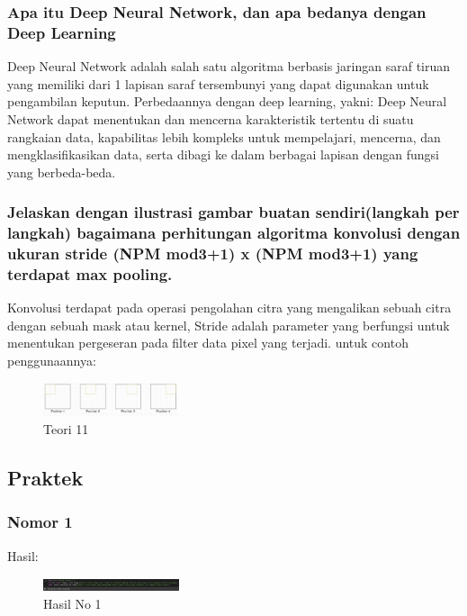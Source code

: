 \subsubsection{Apa itu Deep Neural Network, dan apa bedanya dengan Deep Learning}
\hfill\break
Deep Neural Network adalah salah satu algoritma berbasis jaringan saraf tiruan yang memiliki dari 1 lapisan saraf tersembunyi yang dapat digunakan untuk pengambilan keputun. Perbedaannya dengan deep learning, yakni: Deep Neural Network dapat menentukan dan mencerna karakteristik tertentu di suatu rangkaian data, kapabilitas lebih kompleks untuk mempelajari, mencerna, dan mengklasifikasikan data, serta dibagi ke dalam berbagai lapisan dengan fungsi yang berbeda-beda.

\subsubsection{Jelaskan dengan ilustrasi gambar buatan sendiri(langkah per langkah) bagaimana perhitungan algoritma konvolusi dengan ukuran stride (NPM mod3+1) x (NPM mod3+1) yang terdapat max pooling.}	
\hfill\break
Konvolusi terdapat pada operasi pengolahan citra yang mengalikan sebuah citra dengan sebuah mask atau kernel, Stride adalah parameter yang berfungsi untuk menentukan pergeseran pada filter data pixel yang terjadi. untuk contoh penggunaannya:
\begin{figure}[H]
\centering
	\includegraphics[width=4cm]{figures/1174066/7/11.jpg}
\caption{Teori 11}
\end{figure}



\subsection{Praktek}
\subsubsection{Nomor 1}
\hfill\break

Hasil:
\begin{figure}[H]
\centering
	\includegraphics[width=4cm]{figures/1174066/7/no1.jpg}
	\caption{Hasil No 1}
\end{figure}


